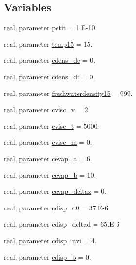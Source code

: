 \subsection*{Variables}
\begin{DoxyCompactItemize}
\item 
real, parameter \mbox{\hyperlink{namespacemoduleoil_a4c54c8c5599a96c18dbcd275ad63854a}{petit}} = 1.\+E-\/10
\item 
real, parameter \mbox{\hyperlink{namespacemoduleoil_a4755b7333b284419e721926797d7d9cc}{temp15}} = 15.
\item 
real, parameter \mbox{\hyperlink{namespacemoduleoil_abdd514937ab9c47037f4547fd9228fad}{cdens\+\_\+de}} = 0.
\item 
real, parameter \mbox{\hyperlink{namespacemoduleoil_aca63c50e0dbeec5aa0697522643eeb66}{cdens\+\_\+dt}} = 0.
\item 
real, parameter \mbox{\hyperlink{namespacemoduleoil_aa67faf2d733fc126badfa6826889d04b}{freshwaterdensity15}} = 999.
\item 
real, parameter \mbox{\hyperlink{namespacemoduleoil_a17328240dfe3a5164beda37e30975304}{cvisc\+\_\+v}} = 2.
\item 
real, parameter \mbox{\hyperlink{namespacemoduleoil_a5144615100792e9b403610892988a8a1}{cvisc\+\_\+t}} = 5000.
\item 
real, parameter \mbox{\hyperlink{namespacemoduleoil_aeea5bdbe646124d8bd397fbe5a223fb6}{cvisc\+\_\+m}} = 0.
\item 
real, parameter \mbox{\hyperlink{namespacemoduleoil_a7ad579a5168861e86017221575d0b313}{cevap\+\_\+a}} = 6.
\item 
real, parameter \mbox{\hyperlink{namespacemoduleoil_a507a8e87d7d8d36e3b6b1f7ad9ca5698}{cevap\+\_\+b}} = 10.
\item 
real, parameter \mbox{\hyperlink{namespacemoduleoil_a5bedad0e5aa6ea6de8fbe130790ddcae}{cevap\+\_\+deltaz}} = 0.
\item 
real, parameter \mbox{\hyperlink{namespacemoduleoil_acde44825165b6fc78cec36ab327d519e}{cdisp\+\_\+d0}} = 37.\+E-\/6
\item 
real, parameter \mbox{\hyperlink{namespacemoduleoil_a26b3cfcf7bdde168be0e28fe85ef9054}{cdisp\+\_\+deltad}} = 65.\+E-\/6
\item 
real, parameter \mbox{\hyperlink{namespacemoduleoil_ae89ac5ef3bc360e058289d7370564447}{cdisp\+\_\+uvi}} = 4.
\item 
real, parameter \mbox{\hyperlink{namespacemoduleoil_aa8fdd7072f57d8703ac2a0aa5b73438b}{cdisp\+\_\+b}} = 0.

\end{DoxyCompactItemize}
